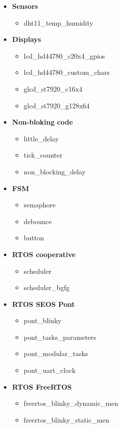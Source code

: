 \begin{itemize}
\item \textbf{Sensors}
    \begin{itemize}
    \item dht11\_temp\_humidity
    \end{itemize}

\item \textbf{Displays}
    \begin{itemize}
    \item lcd\_hd44780\_c20x4\_gpios
    \item lcd\_hd44780\_custom\_chars
    \item glcd\_st7920\_c16x4
    \item glcd\_st7920\_g128x64 
    \end{itemize}

\item \textbf{Non-bloking code}
    \begin{itemize}
    \item little\_delay
    \item tick\_counter
    \item non\_blocking\_delay
    \end{itemize}

\item \textbf{FSM}
    \begin{itemize}
    \item semaphore
    \item debounce
    \item button
    \end{itemize}

\item \textbf{RTOS cooperative}
    \begin{itemize}
    \item scheduler
    \item scheduler\_bgfg
    \end{itemize}

\item \textbf{RTOS SEOS Pont}
    \begin{itemize}
    \item pont\_blinky
    \item pont\_tasks\_parameters
    \item pont\_modular\_tasks
    \item pont\_uart\_clock
    \end{itemize}

\item \textbf{RTOS FreeRTOS}
    \begin{itemize}
    \item freertos\_blinky\_dynamic\_men
    \item freertos\_blinky\_static\_men
    \end{itemize}

\end{itemize}

